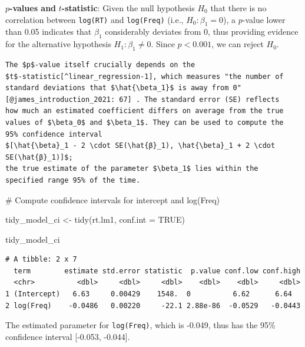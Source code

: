 \documentclass[
  11pt,
  letterpaper,
  DIV=11,
  numbers=noendperiod]{scrreprt}
\newenvironment{Shaded}{\begin{snugshade}}{\end{snugshade}}
\newcommand{\AttributeTok}[1]{\textcolor[rgb]{0.40,0.45,0.13}{#1}}
\newcommand{\CommentTok}[1]{\textcolor[rgb]{0.37,0.37,0.37}{#1}}
\newcommand{\ConstantTok}[1]{\textcolor[rgb]{0.56,0.35,0.01}{#1}}
\newcommand{\FunctionTok}[1]{\textcolor[rgb]{0.28,0.35,0.67}{#1}}
\newcommand{\NormalTok}[1]{\textcolor[rgb]{0.00,0.23,0.31}{#1}}
\newcommand{\OtherTok}[1]{\textcolor[rgb]{0.00,0.23,0.31}{#1}}
\begin{document}
\begin{tcolorbox}[enhanced jigsaw, toprule=.15mm, opacitybacktitle=0.6, coltitle=black, arc=.35mm, colback=white, title=\textcolor{quarto-callout-tip-color}{\faLightbulb}\hspace{0.5em}{\(p\)-values and \(t\)-statistic}, titlerule=0mm, toptitle=1mm, bottomtitle=1mm, breakable, rightrule=.15mm, opacityback=0, bottomrule=.15mm, leftrule=.75mm, colframe=quarto-callout-tip-color-frame, left=2mm, colbacktitle=quarto-callout-tip-color!10!white]

\(p\)\textbf{-values and} \(t\)\textbf{-statistic}: Given the null
hypothesis \(H_0\) that there is no correlation between \texttt{log(RT)}
and \texttt{log(Freq)} (i.e., \(H_0: \beta_1 = 0\)), a \(p\)-value lower
than 0.05 indicates that \(\beta_1\) considerably deviates from 0, thus
providing evidence for the alternative hypothesis
\(H_1: \beta_1 \ne 0\). Since \(p < 0.001\), we can reject \(H_0\).

\begin{verbatim}
The $p$-value itself crucially depends on the
$t$-statistic[^linear_regression-1], which measures "the number of
standard deviations that $\hat{\beta_1}$ is away from 0"
[@james_introduction_2021: 67] . The standard error (SE) reflects
how much an estimated coefficient differs on average from the true
values of $\beta_0$ and $\beta_1$. They can be used to compute the
95% confidence interval
$[\hat{\beta}_1 - 2 \cdot SE(\hat{β}_1), \hat{\beta}_1 + 2 \cdot SE(\hat{β}_1)]$;
the true estimate of the parameter $\beta_1$ lies within the
specified range 95% of the time.
\end{verbatim}

\begin{Shaded}
\begin{Highlighting}[]
\CommentTok{\# Compute confidence intervals for intercept and log(Freq)}

\NormalTok{tidy\_model\_ci }\OtherTok{\textless{}{-}} \FunctionTok{tidy}\NormalTok{(rt.lm1, }\AttributeTok{conf.int =} \ConstantTok{TRUE}\NormalTok{)}

\NormalTok{tidy\_model\_ci}
\end{Highlighting}
\end{Shaded}

\begin{verbatim}
# A tibble: 2 x 7
  term        estimate std.error statistic  p.value conf.low conf.high
  <chr>          <dbl>     <dbl>     <dbl>    <dbl>    <dbl>     <dbl>
1 (Intercept)   6.63     0.00429    1548.  0          6.62      6.64  
2 log(Freq)    -0.0486   0.00220     -22.1 2.88e-86  -0.0529   -0.0443
\end{verbatim}

The estimated parameter for \texttt{log(Freq)}, which is -0.049, thus
has the 95\% confidence interval {[}-0.053, -0.044{]}.

\end{tcolorbox}
\end{document}
